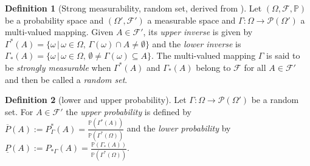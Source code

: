 \documentclass[
]{report}
\theoremstyle{definition}
\theoremstyle{definition}
\newtheorem{definition}{Definition}[section]
\begin{document}
\begin{definition}[Strong measurability, random set, derived from \cite{MIRANDA200532}]
Let $(\Omega, \mathcal{F}, \mathbb{P})$ be a probability space and $(\Omega', \mathcal{F}')$ a measurable space and $\Gamma: \Omega \rightarrow \mathcal{P}(\Omega')$ a multi-valued mapping. Given $A \in \mathcal{F}'$, its \textit{upper inverse} is given by $\Gamma^*(A) = \{\omega \, | \, \omega \in \Omega, \, \Gamma(\omega) \cap A \neq \emptyset \}$ and the \textit{lower inverse} is $\Gamma_*(A) = \{\omega \, | \, \omega \in \Omega, \, \emptyset \neq \Gamma(\omega) \subseteq A \}$. The multi-valued mapping $\Gamma$ is said to be \textit{strongly measurable} when $\Gamma^*(A)$ and $\Gamma_*(A)$ belong to $\mathcal{F}$ for all $A \in \mathcal{F}'$ and then be called a \textit{random set}.
\end{definition}

\begin{definition}[lower and upper probability]
Let $\Gamma: \Omega \rightarrow \mathcal{P}(\Omega')$ be a random set. For $A \in \mathcal{F}'$ the \textit{upper probability} is defined by $\overline{P}(A) := P^*_\Gamma (A) = \displaystyle\frac{\mathbb{P}(\Gamma^*(A))}{\mathbb{P}(\Gamma^*(\Omega))}$ and the \textit{lower probability} by $\underline{P} (A) := P_{*\Gamma} (A) = \displaystyle\frac{\mathbb{P}(\Gamma_*(A))}{\mathbb{P}(\Gamma^*(\Omega))}$.
\end{definition}
\end{document}
